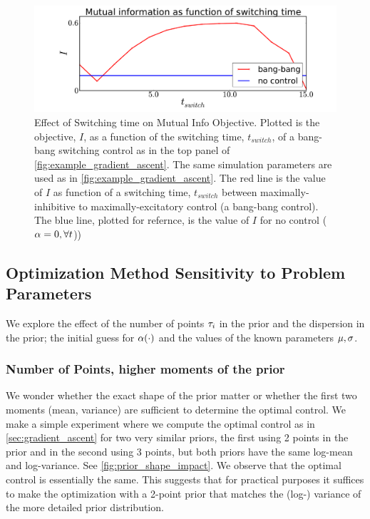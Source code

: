 \begin{figure}[htp]
\begin{center}
  \includegraphics[width=1\textwidth]{Figs/AdjointOptimizer/SweepSwitchpoint_wide.pdf}
  \caption[Effect of Switching time on Mutual Info Objective]{Effect of
  Switching time on Mutual Info Objective. Plotted is the objective, $I$, as a
  function of the switching time, $t_{switch}$, of a bang-bang switching control
  as in the top panel of \cref{fig:example_gradient_ascent}. The same
  simulation parameters are used as in \cref{fig:example_gradient_ascent}. The
  red line is the value of $I$ as function of a switching time, $t_{switch}$
  between maximally-inhibitive to maximally-excitatory control (a bang-bang
  control). The blue line, plotted for refernce, is the value of
  $I$ for no control ($\alpha=0, \forall t$))}
  \label{fig:sweep_switchtime}
\end{center}
\end{figure}


\subsection{Optimization Method Sensitivity to Problem Parameters}
We explore the effect of the number of points
${\tau}_i$ in the prior and the dispersion in the prior; the initial
guess for $\alpha(\cdot)$ and the values of the known parameters ${\mu }, \sigma$. 

\subsubsection{Number of Points, higher moments of the prior}
We wonder whether the exact shape of the prior matter or whether the first two
moments (mean, variance) are sufficient to determine the optimal control. We
make a simple experiment where we compute the optimal control as in
\cref{sec:gradient_ascent} for two very similar priors, the first using 2 points
in the prior and in the second using 3 points, but both priors have the same
log-mean and log-variance. See \cref{fig:prior_shape_impact}. We observe that
the optimal control is essentially the same. This suggests that for practical
purposes it suffices to make the optimization with a 2-point prior that matches
the (log-) variance of the more detailed prior distribution.
 
